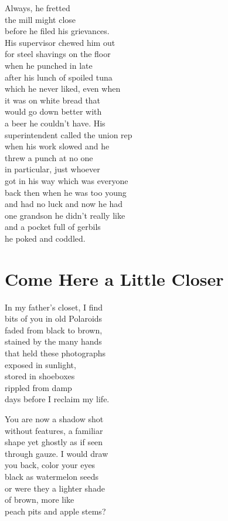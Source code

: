 \documentclass[twoside,10pt]{book}
\begin{document}
Always, he fretted\\
the mill might close\\
before he filed his grievances.\\
His supervisor chewed him out\\
for steel shavings on the floor\\
when he punched in late\\
after his lunch of spoiled tuna\\
which he never liked, even when\\
it was on white bread that\\
would go down better with\\
a beer he couldn't have. His\\
superintendent called the union rep\\
when his work slowed and he\\
threw a punch at no one\\
in particular, just whoever\\
got in his way which was everyone\\
back then when he was too young\\
and had no luck and now he had\\
one grandson he didn't really like\\
and a pocket full of gerbils\\
he poked and coddled.


\clearpage
\section{Come Here a Little Closer}

In my father's closet, I find\\
bits of you in old Polaroids\\
faded from black to brown,\\
stained by the many hands\\
that held these photographs\\
exposed in sunlight,\\
stored in shoeboxes\\
rippled from damp\\
days before I reclaim my life.

You are now a shadow shot\\
without features, a familiar\\
shape yet ghostly as if seen\\
through gauze. I would draw\\
you back, color your eyes\\
black as watermelon seeds\\
or were they a lighter shade\\
of brown, more like\\
peach pits and apple stems?
\end{document}
